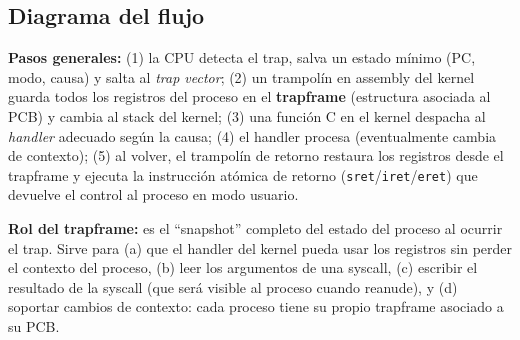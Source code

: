 \documentclass[11pt,a4paper]{article}
\begin{document}
\subsection*{Diagrama del flujo}

\begin{center}
\end{center}

\begin{respuesta}
\textbf{Pasos generales:} (1) la CPU detecta el trap, salva un
estado mínimo (PC, modo, causa) y salta al \emph{trap vector}; (2)
un trampolín en assembly del kernel guarda todos los registros del
proceso en el \textbf{trapframe} (estructura asociada al PCB) y
cambia al stack del kernel; (3) una función C en el kernel despacha
al \emph{handler} adecuado según la causa; (4) el handler procesa
(eventualmente cambia de contexto); (5) al volver, el trampolín de
retorno restaura los registros desde el trapframe y ejecuta la
instrucción atómica de retorno (\texttt{sret}/\texttt{iret}/\texttt{eret})
que devuelve el control al proceso en modo usuario.

\textbf{Rol del trapframe:} es el ``snapshot'' completo del estado
del proceso al ocurrir el trap. Sirve para (a) que el handler del
kernel pueda usar los registros sin perder el contexto del proceso,
(b) leer los argumentos de una syscall, (c) escribir el resultado
de la syscall (que será visible al proceso cuando reanude), y (d)
soportar cambios de contexto: cada proceso tiene su propio
trapframe asociado a su PCB.
\end{respuesta}
\end{document}
